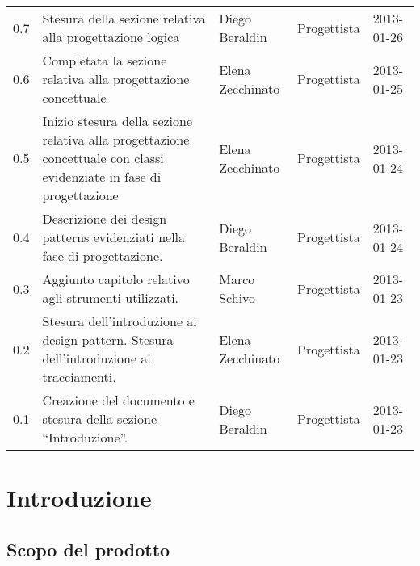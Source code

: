 \begin{center}
\begin{longtable}{lp{}lll}
0.7 & Stesura della sezione relativa alla progettazione logica &Diego Beraldin  & Progettista & 2013-01-26\\
0.6 & Completata la sezione relativa alla progettazione concettuale &Elena Zecchinato & Progettista & 2013-01-25\\
0.5 & Inizio stesura della sezione relativa alla progettazione concettuale con classi evidenziate in fase di progettazione &Elena Zecchinato& Progettista & 2013-01-24\\
0.4 & Descrizione dei design patterns evidenziati nella fase di progettazione. &Diego Beraldin & Progettista & 2013-01-24\\
0.3 & Aggiunto capitolo relativo agli strumenti utilizzati.& Marco Schivo & Progettista & 2013-01-23\\
0.2 & Stesura dell'introduzione ai design pattern. Stesura dell'introduzione ai tracciamenti. &Elena Zecchinato & Progettista & 2013-01-23\\
0.1 & Creazione del documento e stesura della sezione ``Introduzione''. &Diego Beraldin & Progettista & 2013-01-23\\
\bottomrule
\end{longtable}
\end{center}
\newpage



\setcounter{page}{1}
\pagestyle{normal}

\newpage

\section{Introduzione}
\subsection{Scopo del prodotto}
\purpose

